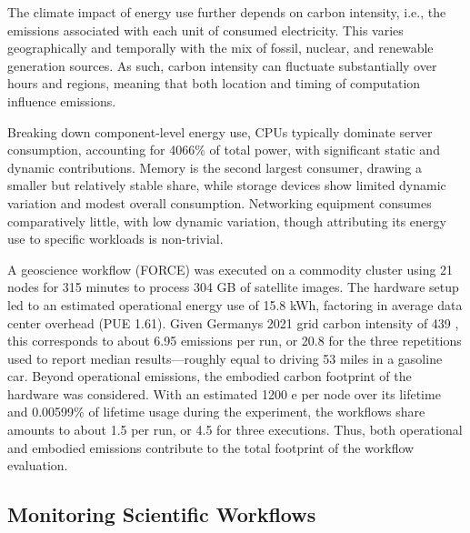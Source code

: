 The climate impact of energy use further depends on carbon intensity, i.e., the emissions associated with each unit of consumed electricity. This varies geographically and temporally with the mix of fossil, nuclear, and renewable generation sources. As such, carbon intensity can fluctuate substantially over hours and regions, meaning that both location and timing of computation influence emissions.

Breaking down component-level energy use, CPUs typically dominate server consumption, accounting for 4066\% of total power, with significant static and dynamic contributions. Memory is the second largest consumer, drawing a smaller but relatively stable share, while storage devices show limited dynamic variation and modest overall consumption. Networking equipment consumes comparatively little, with low dynamic variation, though attributing its energy use to specific workloads is non-trivial.

A geoscience workflow (FORCE) was executed on a commodity cluster using 21 nodes for 315 minutes to process 304 GB of satellite images. The hardware setup led to an estimated operational energy use of 15.8 kWh, factoring in average data center overhead (PUE 1.61). Given Germanys 2021 grid carbon intensity of 439 , this corresponds to about 6.95  emissions per run, or 20.8  for the three repetitions used to report median results—roughly equal to driving 53 miles in a gasoline car. Beyond operational emissions, the embodied carbon footprint of the hardware was considered. With an estimated 1200 e per node over its lifetime and 0.00599\% of lifetime usage during the experiment, the workflows share amounts to about 1.5  per run, or 4.5  for three executions. Thus, both operational and embodied emissions contribute to the total footprint of the workflow evaluation.

\subsection{Monitoring Scientific Workflows}
\label{sec:background_monitoring}

